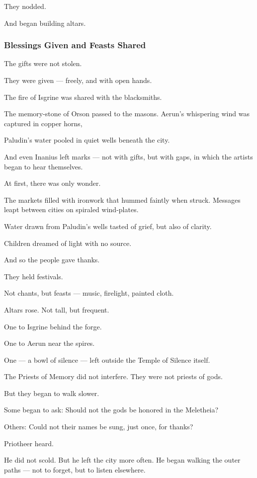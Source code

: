 \documentclass[12pt]{article}
\begin{document}
They nodded.

And began building altars.


\dotfill

\subsubsection{Blessings Given and Feasts Shared}

The gifts were not stolen.  

They were given — freely, and with open hands.

The fire of Isgrine was shared with the blacksmiths.  

The memory-stone of Orson passed to the masons.  
Aerun’s whispering wind was captured in copper horns,  

Paludin’s water pooled in quiet wells beneath the city.  

And even Inanius left marks —  
not with gifts, but with gaps,  
in which the artists began to hear themselves.

At first, there was only wonder.

The markets filled with ironwork that hummed faintly when struck.  
Messages leapt between cities on spiraled wind-plates.  

Water drawn from Paludin’s wells tasted of grief, but also of clarity.  

Children dreamed of light with no source.

And so the people gave thanks.

They held festivals. 

Not chants, but feasts — music, firelight, painted cloth.

Altars rose. Not tall, but frequent.

One to Isgrine behind the forge.  

One to Aerun near the spires.  

One — a bowl of silence — left outside the Temple of Silence itself.

The Priests of Memory did not interfere.  
They were not priests of gods.

But they began to walk slower.

Some began to ask:  
Should not the gods be honored in the Meletheia?

Others:  
Could not their names be sung, just once, for thanks?

Priotheer heard.

He did not scold.  
But he left the city more often.  
He began walking the outer paths — not to forget, but to listen elsewhere.
\end{document}
